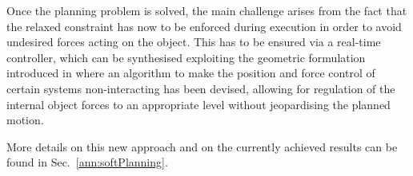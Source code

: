 Once the planning problem is solved, the main challenge arises from the fact that the relaxed constraint has now to be enforced during execution in order to avoid undesired forces acting on the object.
This has to be ensured via a real-time controller, which can be synthesised exploiting the geometric formulation introduced in \cite{prattichizzo1997consistent,prattichizzo1998dynamic} where an algorithm to make the position and force control of certain systems non-interacting has been devised, allowing for regulation of the internal object forces to an appropriate level without jeopardising the planned motion.

More details on this new approach and on the currently achieved results can be found in Sec.~\ref{ann:softPlanning}. %